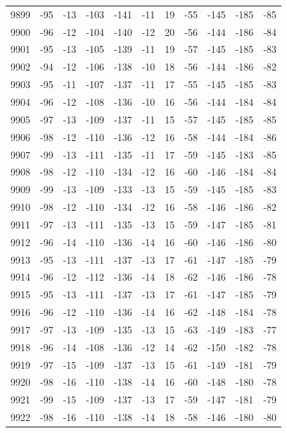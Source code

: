 \begin{table}[H]
\begin{tabular}{lllllllllll}
9899 & -95 & -13 & -103 & -141 & -11 & 19 & -55 & -145 & -185 & -85 \\
9900 & -96 & -12 & -104 & -140 & -12 & 20 & -56 & -144 & -186 & -84 \\
9901 & -95 & -13 & -105 & -139 & -11 & 19 & -57 & -145 & -185 & -83 \\
9902 & -94 & -12 & -106 & -138 & -10 & 18 & -56 & -144 & -186 & -82 \\
9903 & -95 & -11 & -107 & -137 & -11 & 17 & -55 & -145 & -185 & -83 \\
9904 & -96 & -12 & -108 & -136 & -10 & 16 & -56 & -144 & -184 & -84 \\
9905 & -97 & -13 & -109 & -137 & -11 & 15 & -57 & -145 & -185 & -85 \\
9906 & -98 & -12 & -110 & -136 & -12 & 16 & -58 & -144 & -184 & -86 \\
9907 & -99 & -13 & -111 & -135 & -11 & 17 & -59 & -145 & -183 & -85 \\
9908 & -98 & -12 & -110 & -134 & -12 & 16 & -60 & -146 & -184 & -84 \\
9909 & -99 & -13 & -109 & -133 & -13 & 15 & -59 & -145 & -185 & -83 \\
9910 & -98 & -12 & -110 & -134 & -12 & 16 & -58 & -146 & -186 & -82 \\
9911 & -97 & -13 & -111 & -135 & -13 & 15 & -59 & -147 & -185 & -81 \\
9912 & -96 & -14 & -110 & -136 & -14 & 16 & -60 & -146 & -186 & -80 \\
9913 & -95 & -13 & -111 & -137 & -13 & 17 & -61 & -147 & -185 & -79 \\
9914 & -96 & -12 & -112 & -136 & -14 & 18 & -62 & -146 & -186 & -78 \\
9915 & -95 & -13 & -111 & -137 & -13 & 17 & -61 & -147 & -185 & -79 \\
9916 & -96 & -12 & -110 & -136 & -14 & 16 & -62 & -148 & -184 & -78 \\
9917 & -97 & -13 & -109 & -135 & -13 & 15 & -63 & -149 & -183 & -77 \\
9918 & -96 & -14 & -108 & -136 & -12 & 14 & -62 & -150 & -182 & -78 \\
9919 & -97 & -15 & -109 & -137 & -13 & 15 & -61 & -149 & -181 & -79 \\
9920 & -98 & -16 & -110 & -138 & -14 & 16 & -60 & -148 & -180 & -78 \\
9921 & -99 & -15 & -109 & -137 & -13 & 17 & -59 & -147 & -181 & -79 \\
9922 & -98 & -16 & -110 & -138 & -14 & 18 & -58 & -146 & -180 & -80 \\

\end{tabular}
\end{table}
